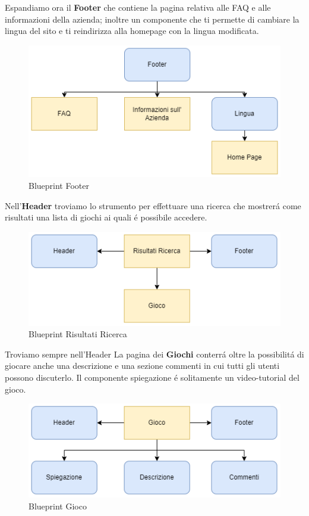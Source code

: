 \documentclass[../Report.tex]{subfiles}
\begin{document}
    Espandiamo ora il \textbf{Footer} che contiene la pagina relativa alle FAQ e alle informazioni della azienda; inoltre un componente che ti permette di cambiare la lingua del sito e ti reindirizza alla homepage con la lingua modificata.
    \begin{figure}[H]
        \includegraphics[width=.8\linewidth]{BP_footer.png}
        \centering
        \caption{Blueprint Footer}
    \end{figure}

    Nell'\textbf{Header} troviamo lo strumento per effettuare una ricerca che mostrerá come risultati una lista di giochi ai quali é possibile accedere.
    \begin{figure}[H]
        \includegraphics[width=.8\linewidth]{BP_RisultatiRicerca.png}
        \centering
        \caption{Blueprint Risultati Ricerca}
    \end{figure}

    Troviamo sempre nell'Header 
    La pagina dei \textbf{Giochi} conterrá oltre la possibilitá di giocare anche una descrizione e una sezione commenti in cui tutti gli utenti possono discuterlo.
    Il componente spiegazione é solitamente un video-tutorial del gioco.
    \begin{figure}[H]
        \includegraphics[width=\linewidth]{BP_Gioco.png}
        \centering
        \caption{Blueprint Gioco}
    \end{figure}
\end{document}
